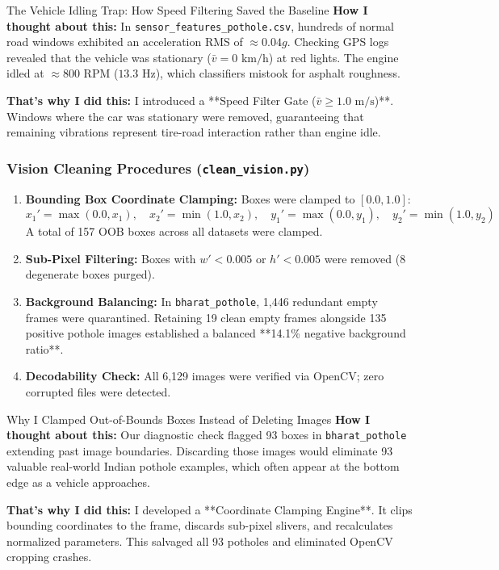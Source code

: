 \begin{designreflection}{The Vehicle Idling Trap: How Speed Filtering Saved the Baseline}
\textbf{How I thought about this:}
In \texttt{sensor\_features\_pothole.csv}, hundreds of normal road windows exhibited an acceleration RMS of $\approx 0.04g$. Checking GPS logs revealed that the vehicle was stationary ($\bar{v} = 0\text{ km/h}$) at red lights. The engine idled at $\approx 800\text{ RPM}$ ($13.3\text{ Hz}$), which classifiers mistook for asphalt roughness.

\textbf{That's why I did this:}
I introduced a **Speed Filter Gate ($\bar{v} \ge 1.0\text{ m/s}$)**. Windows where the car was stationary were removed, guaranteeing that remaining vibrations represent tire-road interaction rather than engine idle.
\end{designreflection}

\subsubsection{Vision Cleaning Procedures (\texttt{clean\_vision.py})}
\begin{enumerate}
    \item \textbf{Bounding Box Coordinate Clamping:} Boxes were clamped to $[0.0, 1.0]$:
    \begin{equation}
    x_1' = \max(0.0, x_1), \quad x_2' = \min(1.0, x_2), \quad y_1' = \max(0.0, y_1), \quad y_2' = \min(1.0, y_2)
    \end{equation}
    A total of 157 OOB boxes across all datasets were clamped.
    \item \textbf{Sub-Pixel Filtering:} Boxes with $w' < 0.005$ or $h' < 0.005$ were removed (8 degenerate boxes purged).
    \item \textbf{Background Balancing:} In \texttt{bharat\_pothole}, 1,446 redundant empty frames were quarantined. Retaining 19 clean empty frames alongside 135 positive pothole images established a balanced **14.1\% negative background ratio**.
    \item \textbf{Decodability Check:} All 6,129 images were verified via OpenCV; zero corrupted files were detected.
\end{enumerate}

\begin{designreflection}{Why I Clamped Out-of-Bounds Boxes Instead of Deleting Images}
\textbf{How I thought about this:}
Our diagnostic check flagged 93 boxes in \texttt{bharat\_pothole} extending past image boundaries. Discarding those images would eliminate 93 valuable real-world Indian pothole examples, which often appear at the bottom edge as a vehicle approaches.

\textbf{That's why I did this:}
I developed a **Coordinate Clamping Engine**. It clips bounding coordinates to the frame, discards sub-pixel slivers, and recalculates normalized parameters. This salvaged all 93 potholes and eliminated OpenCV cropping crashes.
\end{designreflection}

